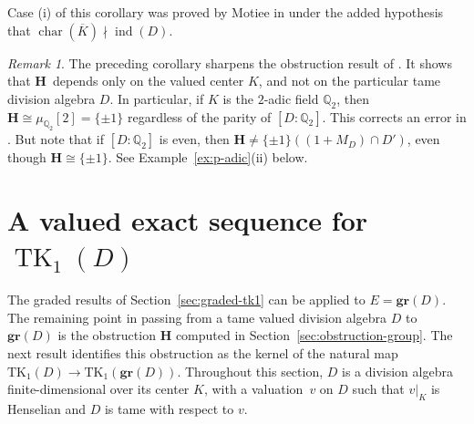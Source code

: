 \documentclass[11pt]{article}
\numberwithin{equation}{section}
\theoremstyle{plain}
\theoremstyle{remark}
\newtheorem{remark}[theorem]{Remark}
\newcommand{\gr}{\mathbf{gr}}
\newcommand{\opn}{\operatorname}
\newcommand{\TK}{\opn{TK_1}}
\newcommand{\charr}{\opn{char}}
\newcommand{\ov}{\overline}
\newcommand{\bH}{\mathbf{H}}
\begin{document}
Case (i) of this corollary was proved by Motiee in \cite[Th.~9]{motiee-2013} under the added 
hypothesis that $\charr(\ov K)\nmid\opn{ind}(D)$.

\begin{remark}
The preceding corollary sharpens the obstruction result of \cite{khanh-khoa-2025}. It shows that $\mathbf{H}$~depends 
only 
on the valued center $K$, and not on the particular tame division algebra $D$. In particular, if $K$ is the $2$-adic 
field $\mathbb Q_2$, then  $\mathbf{H}\cong \mu_{\mathbb Q_2}[2]=\{\pm1\}$ regardless of the parity of 
$[D:\mathbb Q_2]$.
This corrects an error in 
\cite[Prop.~3(2)]{khanh-khoa-2025}.  But note that if $[D:\mathbb Q_2]$ is even, then 
$\bH \ne \{\pm 1\}((1+M_D)\cap D')$, even though
$\bH \cong \{\pm 1\}$.  See Example~\ref{ex:p-adic}(ii)  below.
\end{remark}



\section{A valued exact sequence for $\operatorname{TK}_1(D)$}\label{sec:valued-exact-sequence}

The graded results of Section~\ref{sec:graded-tk1} can be applied to $E=\gr(D)$.  The remaining point in passing from 
a tame valued division algebra $D$ to $\gr(D)$ is the obstruction $\bH$ computed in Section~\ref{sec:obstruction-group}.  
The next result identifies this obstruction as the kernel of the natural map $\TK(D)\to\TK(\gr(D))$.  Throughout this 
section, 
$D$ is a division algebra finite-dimensional over its center $K$, with a valuation~$v$ on $D$ such that $v|_K$ is 
Henselian and $D$ is tame with respect to $v$.
\end{document}
